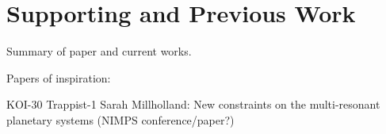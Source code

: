 \section{Supporting and Previous Work}
Summary of paper and current works.

Papers of inspiration:

KOI-30
Trappist-1
Sarah Millholland: New constraints on the multi-resonant planetary systems (NIMPS conference/paper?)
